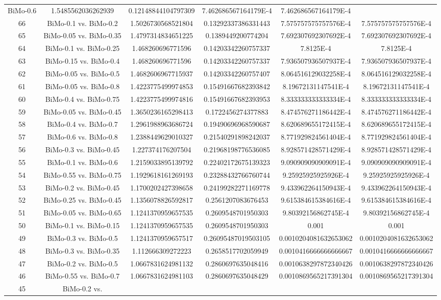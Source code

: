 \documentclass[a4paper,10pt]{article}
\begin{document}
\begin{landscape}
\begin{table}[!htp]
\begin{tabular}{cccccc}
BiMo-0.6&1.5485562036262939&0.12148844104797309&7.462686567164179E-4&7.462686567164179E-4\\66&BiMo-0.1 vs. BiMo-0.2&1.5026730568521804&0.13292337386331443&7.575757575757576E-4&7.575757575757576E-4\\65&BiMo-0.05 vs. BiMo-0.35&1.4797314834651225&0.1389449200774204&7.692307692307692E-4&7.692307692307692E-4\\64&BiMo-0.1 vs. BiMo-0.25&1.468260696771596&0.14203342260757337&7.8125E-4&7.8125E-4\\63&BiMo-0.15 vs. BiMo-0.4&1.468260696771596&0.14203342260757337&7.936507936507937E-4&7.936507936507937E-4\\62&BiMo-0.05 vs. BiMo-0.5&1.4682606967715937&0.14203342260757407&8.064516129032258E-4&8.064516129032258E-4\\61&BiMo-0.05 vs. BiMo-0.8&1.4223775499974853&0.15491667682393842&8.19672131147541E-4&8.19672131147541E-4\\60&BiMo-0.4 vs. BiMo-0.75&1.4223775499974816&0.15491667682393953&8.333333333333334E-4&8.333333333333334E-4\\59&BiMo-0.05 vs. BiMo-0.45&1.3650236165298413&0.1722456274377883&8.474576271186442E-4&8.474576271186442E-4\\58&BiMo-0.4 vs. BiMo-0.7&1.2961988963686724&0.19490696968590687&8.620689655172415E-4&8.620689655172415E-4\\57&BiMo-0.6 vs. BiMo-0.8&1.2388449629010327&0.21540291898242037&8.771929824561404E-4&8.771929824561404E-4\\56&BiMo-0.3 vs. BiMo-0.45&1.227374176207504&0.21968198776536085&8.928571428571429E-4&8.928571428571429E-4\\55&BiMo-0.1 vs. BiMo-0.6&1.2159033895139792&0.22402172675139323&9.090909090909091E-4&9.090909090909091E-4\\54&BiMo-0.55 vs. BiMo-0.75&1.1929618161269193&0.23288432766760744&9.25925925925926E-4&9.25925925925926E-4\\53&BiMo-0.2 vs. BiMo-0.45&1.1700202427398658&0.24199282271169778&9.433962264150943E-4&9.433962264150943E-4\\52&BiMo-0.25 vs. BiMo-0.45&1.1356078826592817&0.2561207083676453&9.615384615384616E-4&9.615384615384616E-4\\51&BiMo-0.05 vs. BiMo-0.65&1.1241370959657535&0.2609548701950303&9.80392156862745E-4&9.80392156862745E-4\\50&BiMo-0.1 vs. BiMo-0.15&1.1241370959657535&0.2609548701950303&0.001&0.001\\49&BiMo-0.3 vs. BiMo-0.5&1.1241370959657517&0.26095487019503105&0.0010204081632653062&0.0010204081632653062\\48&BiMo-0.3 vs. BiMo-0.35&1.112666309272223&0.2658517702059949&0.0010416666666666667&0.0010416666666666667\\47&BiMo-0.2 vs. BiMo-0.5&1.0667831624981132&0.2860697635048416&0.0010638297872340426&0.0010638297872340426\\46&BiMo-0.55 vs. BiMo-0.7&1.0667831624981103&0.2860697635048429&0.0010869565217391304&0.0010869565217391304\\45&BiMo-0.2 vs. 
\end{tabular}
\end{table}
\end{landscape}
\end{document}
